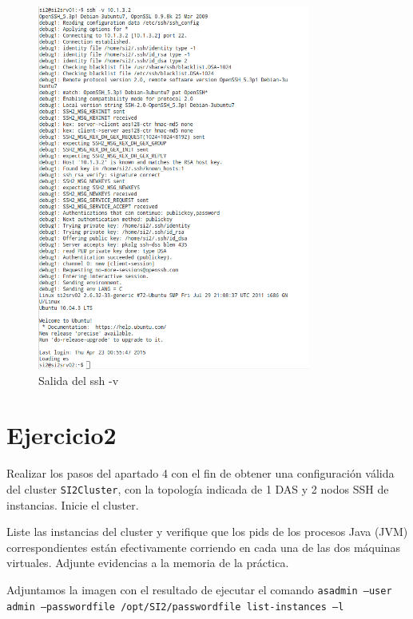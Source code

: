 \documentclass[a4paper, 10pt]{article}
\begin{document}
\begin{figure}[hbtp]
	\centering
	\includegraphics[width=0.8\textwidth]{../../P3/pantallazos/ssh-v.png}
	\caption {Salida del ssh -v}
\end{figure}

 
\newpage
\section{Ejercicio2}


\begin{mdframed}
	 Realizar los pasos del apartado 4 con el fin de obtener una configuración válida del cluster
	 \texttt{SI2Cluster}, con la topología indicada de 1 DAS y 2 nodos SSH de instancias. Inicie el cluster. 
	 
	 Liste las instancias del cluster y verifique que los pids de los procesos Java (JVM) correspondientes están
	 efectivamente corriendo en cada una de las dos máquinas virtuales. Adjunte evidencias a la memoria de la
	 práctica. 
\end{mdframed}	

	Adjuntamos la imagen con  el resultado de ejecutar el comando \texttt{asadmin --user admin --passwordfile /opt/SI2/passwordfile list-instances –l}
 
\end{document}
